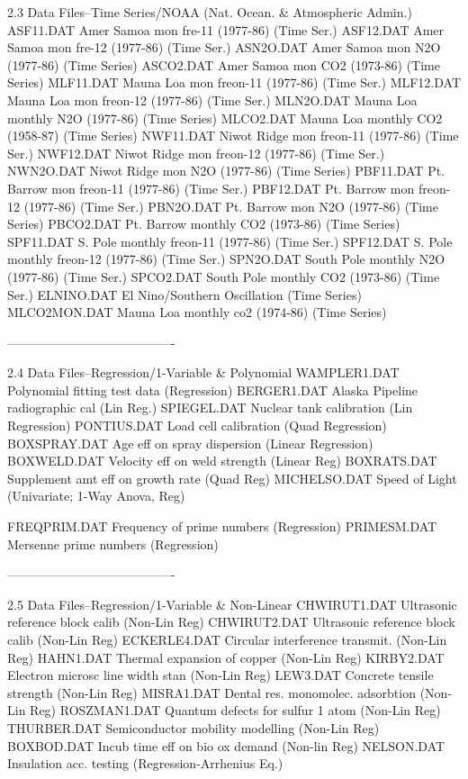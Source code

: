 2.3
Data Files--Time Series/NOAA (Nat. Ocean. & Atmospheric Admin.)
      ASF11.DAT     Amer Samoa mon fre-11 (1977-86) (Time Ser.)
      ASF12.DAT     Amer Samoa mon fre-12 (1977-86) (Time Ser.)
      ASN2O.DAT     Amer Samoa mon N2O (1977-86) (Time Series)
      ASCO2.DAT     Amer Samoa mon CO2 (1973-86) (Time Series)
      MLF11.DAT     Mauna Loa mon freon-11 (1977-86) (Time Ser.)
      MLF12.DAT     Mauna Loa mon freon-12 (1977-86) (Time Ser.)
      MLN2O.DAT     Mauna Loa monthly N2O (1977-86) (Time Series)
      MLCO2.DAT     Mauna Loa monthly CO2 (1958-87) (Time Series)
      NWF11.DAT     Niwot Ridge mon freon-11 (1977-86) (Time Ser.)
      NWF12.DAT     Niwot Ridge mon freon-12 (1977-86) (Time Ser.)
      NWN2O.DAT     Niwot Ridge mon N2O (1977-86) (Time Series)
      PBF11.DAT     Pt. Barrow mon freon-11 (1977-86) (Time Ser.)
      PBF12.DAT     Pt. Barrow mon freon-12 (1977-86) (Time Ser.)
      PBN2O.DAT     Pt. Barrow mon N2O (1977-86) (Time Series)
      PBCO2.DAT     Pt. Barrow monthly CO2 (1973-86) (Time Series)
      SPF11.DAT     S. Pole monthly freon-11 (1977-86) (Time Ser.)
      SPF12.DAT     S. Pole monthly freon-12 (1977-86) (Time Ser.)
      SPN2O.DAT     South Pole monthly N2O (1977-86) (Time Ser.)
      SPCO2.DAT     South Pole monthly CO2 (1973-86) (Time Ser.)
      ELNINO.DAT    El Nino/Southern Oscillation (Time Series)
      MLCO2MON.DAT  Mauna Loa monthly co2 (1974-86) (Time Series)
 
 
 
----------------------------------------
 
2.4
Data Files--Regression/1-Variable & Polynomial
      WAMPLER1.DAT  Polynomial fitting test data (Regression)
      BERGER1.DAT   Alaska Pipeline radiographic cal (Lin Reg.)
      SPIEGEL.DAT   Nuclear tank calibration (Lin Regression)
      PONTIUS.DAT   Load cell calibration (Quad Regression)
      BOXSPRAY.DAT  Age eff on spray dispersion (Linear Regression)
      BOXWELD.DAT   Velocity eff on weld strength (Linear Reg)
      BOXRATS.DAT   Supplement amt eff on growth rate (Quad Reg)
      MICHELSO.DAT  Speed of Light (Univariate; 1-Way Anova, Reg)
 
      FREQPRIM.DAT  Frequency of prime numbers (Regression)
      PRIMESM.DAT   Mersenne prime numbers (Regression)
 
 
 
----------------------------------------
 
2.5
Data Files--Regression/1-Variable & Non-Linear
      CHWIRUT1.DAT  Ultrasonic reference block calib (Non-Lin Reg)
      CHWIRUT2.DAT  Ultrasonic reference block calib (Non-Lin Reg)
      ECKERLE4.DAT  Circular interference transmit. (Non-Lin Reg)
      HAHN1.DAT     Thermal expansion of copper (Non-Lin Reg)
      KIRBY2.DAT    Electron microsc line width stan (Non-Lin Reg)
      LEW3.DAT      Concrete tensile strength (Non-Lin Reg)
      MISRA1.DAT    Dental res. monomolec. adsorbtion (Non-Lin Reg)
      ROSZMAN1.DAT  Quantum defects for sulfur 1 atom (Non-Lin Reg)
      THURBER.DAT   Semiconductor mobility modelling (Non-Lin Reg)
      BOXBOD.DAT    Incub time eff on bio ox demand (Non-lin Reg)
      NELSON.DAT    Insulation acc. testing (Regression-Arrhenius Eq.)
 
